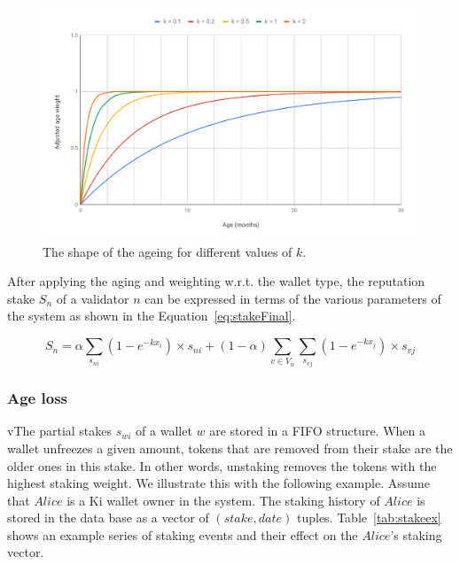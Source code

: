 \documentclass[]{article}
\begin{document}
\begin{figure}[]
\centering
	\includegraphics[width=0.9\linewidth, trim= 0cm 0cm 0cm 0cm, clip]{Figures/chart.pdf}
	\caption{The shape of the ageing for different values of $k$.}
	\label{fig:Age}
\end{figure}

			

After applying the aging and weighting w.r.t. the wallet type, the reputation stake $S_n$ of a validator $n$ can be expressed in terms of the various parameters of the system as shown in the Equation~\ref{eq:stakeFinal}. 

\begin{equation}
\label{eq:stakeFinal}
    S_n = \alpha\sum_{s_{ni}}{(1 - e^{-kx_{i}}) \times s_{ni}} + (1-\alpha) \sum_{v \in V_n} \sum_{s_{vj}}{(1 - e^{-kx_{j}}) \times s_{vj}}
\end{equation}


\subsubsection{Age loss}
vThe partial stakes $s_{wi}$ of a wallet $w$ are stored in a FIFO structure. When a wallet unfreezes a given amount, tokens that are removed from their stake are the older ones in this stake. In other words, unstaking removes the tokens with the highest staking weight. We illustrate this with the following example. Assume that $Alice$ is a Ki wallet owner in the system. The staking history of $Alice$ is stored in the data base as a vector of $(stake, date)$ tuples. Table~\ref{tab:stakeex} shows an example series of staking events and their effect on the $Alice$'s staking vector.
\end{document}

